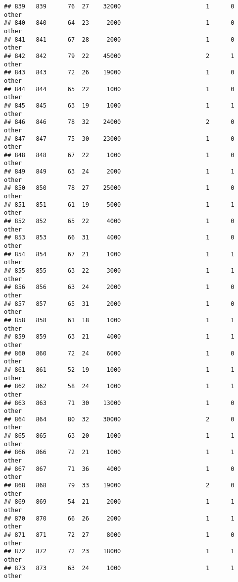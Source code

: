 \documentclass[
]{article}
\begin{document}
\begin{verbatim}
## 839   839      76  27    32000                        1      0    other
## 840   840      64  23     2000                        1      0    other
## 841   841      67  28     2000                        1      0    other
## 842   842      79  22    45000                        2      1    other
## 843   843      72  26    19000                        1      0    other
## 844   844      65  22     1000                        1      0    other
## 845   845      63  19     1000                        1      1    other
## 846   846      78  32    24000                        2      0    other
## 847   847      75  30    23000                        1      0    other
## 848   848      67  22     1000                        1      0    other
## 849   849      63  24     2000                        1      1    other
## 850   850      78  27    25000                        1      0    other
## 851   851      61  19     5000                        1      1    other
## 852   852      65  22     4000                        1      0    other
## 853   853      66  31     4000                        1      0    other
## 854   854      67  21     1000                        1      1    other
## 855   855      63  22     3000                        1      1    other
## 856   856      63  24     2000                        1      0    other
## 857   857      65  31     2000                        1      0    other
## 858   858      61  18     1000                        1      1    other
## 859   859      63  21     4000                        1      1    other
## 860   860      72  24     6000                        1      0    other
## 861   861      52  19     1000                        1      1    other
## 862   862      58  24     1000                        1      1    other
## 863   863      71  30    13000                        1      0    other
## 864   864      80  32    30000                        2      0    other
## 865   865      63  20     1000                        1      1    other
## 866   866      72  21     1000                        1      1    other
## 867   867      71  36     4000                        1      0    other
## 868   868      79  33    19000                        2      0    other
## 869   869      54  21     2000                        1      1    other
## 870   870      66  26     2000                        1      1    other
## 871   871      72  27     8000                        1      0    other
## 872   872      72  23    18000                        1      1    other
## 873   873      63  24     1000                        1      1    other

\end{verbatim}
\end{document}
